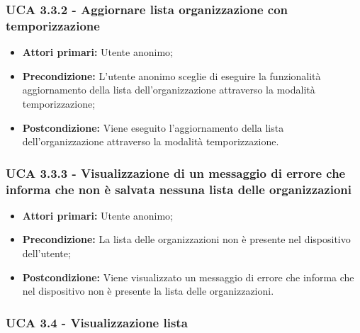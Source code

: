 \subsubsection{UCA 3.3.2 - Aggiornare lista organizzazione con temporizzazione}%
\begin{itemize} 
	\item \textbf{Attori primari:} Utente anonimo;
	\item \textbf{Precondizione:} L'utente anonimo sceglie di eseguire la funzionalità aggiornamento della lista dell'organizzazione attraverso la modalità temporizzazione; 	
	\item \textbf{Postcondizione:} Viene eseguito l'aggiornamento della lista dell'organizzazione attraverso la modalità temporizzazione.
\end{itemize}

\subsubsection{UCA 3.3.3 - Visualizzazione di un messaggio di errore che informa che non è salvata nessuna lista delle organizzazioni}%
\begin{itemize}
	\item \textbf{Attori primari:} Utente anonimo;
	\item \textbf{Precondizione:} La lista delle organizzazioni non è presente nel dispositivo dell'utente;
	\item \textbf{Postcondizione:} Viene visualizzato un messaggio di errore che informa che nel dispositivo non è presente la lista delle organizzazioni.
\end{itemize}

\newpage


\subsubsection{UCA 3.4 - Visualizzazione lista}%

